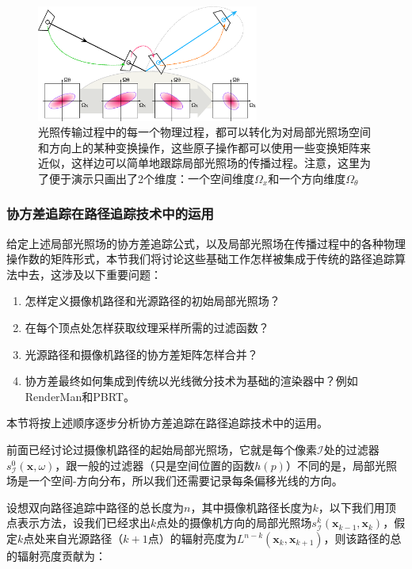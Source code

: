 \begin{figure}
	\sidecaption
	\includegraphics[width=0.65\textwidth]{figures/pt/operators}
	\caption{光照传输过程中的每一个物理过程，都可以转化为对局部光照场空间和方向上的某种变换操作，这些原子操作都可以使用一些变换矩阵来近似，这样边可以简单地跟踪局部光照场的传播过程。注意，这里为了便于演示只画出了2个维度：一个空间维度$\Omega_x$和一个方向维度$\Omega_\theta$}
	\label{f:pt-operators}
\end{figure}





\subsubsection{协方差追踪在路径追踪技术中的运用}
给定上述局部光照场的协方差追踪公式，以及局部光照场在传播过程中的各种物理操作数的矩阵形式，本节我们将讨论这些基础工作怎样被集成于传统的路径追踪算法中去，这涉及以下重要问题：

\begin{enumerate}
	\item 怎样定义摄像机路径和光源路径的初始局部光照场？
	\item 在每个顶点处怎样获取纹理采样所需的过滤函数？
	\item 光源路径和摄像机路径的协方差矩阵怎样合并？
	\item 协方差最终如何集成到传统以光线微分技术为基础的渲染器中？例如RenderMan和PBRT。
\end{enumerate}

本节将按上述顺序逐步分析协方差追踪在路径追踪技术中的运用。

前面已经讨论过摄像机路径的起始局部光照场，它就是每个像素$\mathcal{I}$处的过滤器$s^{0}_{\mathcal{I}}(\mathbf{x},\omega)$，跟一般的过滤器（只是空间位置的函数$h(p)$）不同的是，局部光照场是一个空间-方向分布，所以我们还需要记录每条偏移光线的方向。

设想双向路径追踪中路径的总长度为$n$，其中摄像机路径长度为$k$，以下我们用顶点表示方法，设我们已经求出$k$点处的摄像机方向的局部光照场$s^{k}_{\mathcal{I}}(\mathbf{x}_{k-1},\mathbf{x}_k)$，假定$k$点处来自光源路径（$k+1$点）的辐射亮度为$L^{n-k}(\mathbf{x}_{k},\mathbf{x}_{k+1})$，则该路径的总的辐射亮度贡献为：


